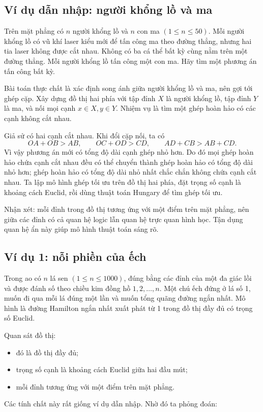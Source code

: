 \documentclass[11pt]{article}
\begin{document}
\subsection{Ví dụ dẫn nhập: người khổng lồ và ma}

Trên mặt phẳng có \(n\) người khổng lồ và \(n\) con ma
\((1\le n\le 50)\). Mỗi người khổng lồ có vũ khí laser kiểu mới để tấn công
ma theo đường thẳng, nhưng hai tia laser không được cắt nhau. Không có ba cá
thể bất kỳ cùng nằm trên một đường thẳng. Mỗi người khổng lồ tấn công một con
ma. Hãy tìm một phương án tấn công bất kỳ.

Bài toán thực chất là xác định song ánh giữa người khổng lồ và ma, nên gợi
tới ghép cặp. Xây dựng đồ thị hai phía với tập đỉnh \(X\) là người khổng lồ,
tập đỉnh \(Y\) là ma, và nối mọi cạnh \(x\in X,y\in Y\). Nhiệm vụ là tìm một
ghép hoàn hảo có các cạnh không cắt nhau.

Giả sử có hai cạnh cắt nhau. Khi đổi cặp nối, ta có
\[
  OA+OB>AB,\qquad OC+OD>CD,\qquad AD+CB>AB+CD.
\]
Vì vậy phương án mới có tổng độ dài cạnh ghép nhỏ hơn. Do đó mọi ghép hoàn
hảo chứa cạnh cắt nhau đều có thể chuyển thành ghép hoàn hảo có tổng độ dài
nhỏ hơn; ghép hoàn hảo có tổng độ dài nhỏ nhất chắc chắn không chứa cạnh cắt
nhau. Ta lập mô hình ghép tối ưu trên đồ thị hai phía, đặt trọng số cạnh là
khoảng cách Euclid, rồi dùng thuật toán Hungary để tìm ghép tối ưu.

Nhận xét: mỗi đỉnh trong đồ thị tương ứng với một điểm trên mặt phẳng, nên
giữa các đỉnh có cả quan hệ logic lẫn quan hệ trực quan hình học. Tận dụng
quan hệ ẩn này giúp mô hình thuật toán sáng rõ.

\subsection{Ví dụ 1: nỗi phiền của ếch}

Trong ao có \(n\) lá sen \((1\le n\le 1000)\), đúng bằng các đỉnh của một đa
giác lồi và được đánh số theo chiều kim đồng hồ \(1,2,\ldots,n\). Một chú ếch
đứng ở lá số 1, muốn đi qua mỗi lá đúng một lần và muốn tổng quãng đường
ngắn nhất. Mô hình là đường Hamilton ngắn nhất xuất phát từ 1 trong đồ thị
đầy đủ có trọng số Euclid.

Quan sát đồ thị:
\begin{itemize}
  \item đó là đồ thị đầy đủ;
  \item trọng số cạnh là khoảng cách Euclid giữa hai đầu mút;
  \item mỗi đỉnh tương ứng với một điểm trên mặt phẳng.
\end{itemize}
Các tính chất này rất giống ví dụ dẫn nhập. Nhờ đó ta phỏng đoán:
\end{document}
